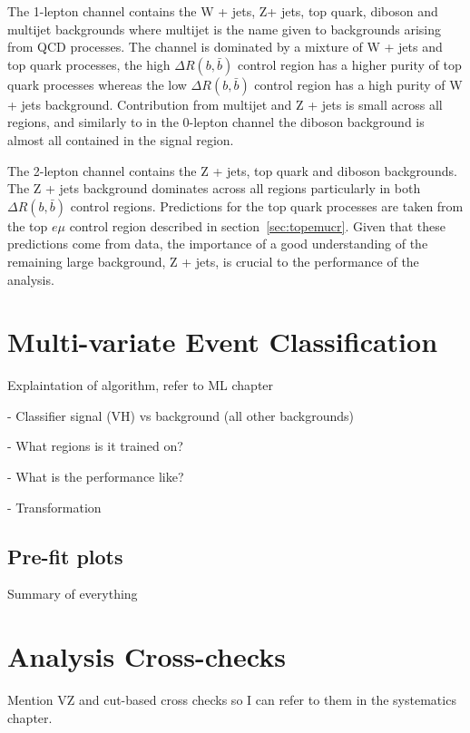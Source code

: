 

The 1-lepton channel contains the W + jets, Z+ jets, top quark, diboson and multijet
backgrounds where multijet is the name given to backgrounds arising from QCD
processes. The channel is dominated by a mixture of W + jets and top quark
processes, the high $\Delta R(b, \bar{b})$ control region has a higher purity of
top quark processes whereas the low $\Delta R(b, \bar{b})$ control region has a
high purity of W + jets background. Contribution from multijet and Z + jets is
small across all regions, and similarly to in the 0-lepton channel the diboson
background is almost all contained in the signal region.

The 2-lepton channel contains the Z + jets, top quark and diboson backgrounds.
The Z + jets background dominates across all regions particularly in both
$\Delta R(b, \bar{b})$ control regions. Predictions for the top quark processes
are taken from the top $e \mu$ control region described in
section~\ref{sec:topemucr}. Given that these predictions come from data, the
importance of a good understanding of the remaining large background, Z + jets,
is crucial to the performance of the analysis.

\section{Multi-variate Event Classification}%
\label{sec:mva}
Explaintation of algorithm, refer to ML chapter

- Classifier signal (VH) vs background (all other backgrounds)

- What regions is it trained on?

- What is the performance like?

- Transformation






\subsection{Pre-fit plots}
Summary of everything






\section{Analysis Cross-checks}
Mention VZ and cut-based cross checks so I can refer to them in the systematics
chapter.






